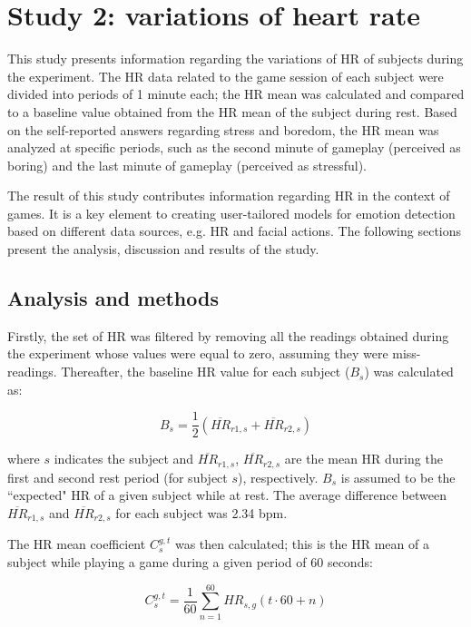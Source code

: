 \section{Study 2: variations of heart rate}
\label{sec:experiment1-study2}

This study presents information regarding the variations of HR of subjects during the experiment. The HR data related to the game session of each subject were divided into periods of 1 minute each; the HR mean was calculated and compared to a baseline value obtained from the HR mean of the subject during rest. Based on the self-reported answers regarding stress and boredom, the HR mean was analyzed at specific periods, such as the second minute of gameplay (perceived as boring) and the last minute of gameplay (perceived as stressful).

The result of this study contributes information regarding HR in the context of games. It is a key element to creating user-tailored models for emotion detection based on different data sources, e.g. HR and facial actions. The following sections present the analysis, discussion and results of the study.

\subsection{Analysis and methods}
\label{sec:study2-methodology}

Firstly, the set of HR was filtered by removing all the readings obtained during the experiment whose values were equal to zero, assuming they were miss-readings. Thereafter, the baseline HR value for each subject ($B_s$) was calculated as:

\begin{equation} \label{eq:baseline}
B_s = \frac{1}{2}(\overline{HR}_{r1,s} + \overline{HR}_{r2,s})
\end{equation}

where $s$ indicates the subject and $\overline{HR}_{r1,s}$, $\overline{HR}_{r2,s}$ are the mean HR during the first and second rest period (for subject $s$), respectively. $B_s$ is assumed to be the ``expected" HR of a given subject while at rest. The average difference between $\overline{HR}_{r1,s}$ and $\overline{HR}_{r2,s}$ for each subject was 2.34 bpm.

The HR mean coefficient $C_s^{g,t}$ was then calculated; this is the HR mean of a subject while playing a game during a given period of 60 seconds:

\begin{equation} \label{eq:variation}
C_s^{g,t} = \frac{1}{60}\sum_{n=1}^{60} HR_{s,g}(t\cdot 60 + n)
\end{equation}

